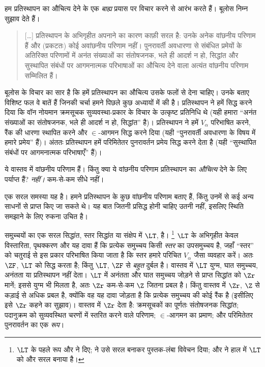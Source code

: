 \documentclass[../../../include/open-logic-section]{subfiles}
\begin{document}

हम प्रतिस्थापन का औचित्य देने के एक \emph{बाह्य} प्रयास पर विचार करने से
आरंभ करते हैं। बूलोस निम्न सुझाव देते हैं।
\begin{quote}
  [\ldots] प्रतिस्थापन के अभिगृहीत अपनाने का कारण काफ़ी सरल है: उनके अनेक
  वांछनीय परिणाम हैं और (प्रकटतः) कोई अवांछनीय परिणाम नहीं। पुनरावर्ती
  अवधारणा से संबंधित प्रमेयों के अतिरिक्त परिणामों में अनंत संख्याओं का
  संतोषजनक, भले ही आदर्श न हो, सिद्धांत और सुस्थापित संबंधों पर आगमनात्मक
  परिभाषाओं का औचित्य देने वाला अत्यंत वांछनीय परिणाम सम्मिलित हैं।
  \citep[229]{Boolos1971}
\end{quote}		
बूलोस के विचार का सार है कि हमें प्रतिस्थापन का औचित्य उसके फलों से देना
चाहिए। उनके बताए विशिष्ट फल वे बातें हैं जिनकी चर्चा हमने पिछले कुछ अध्यायों
में की है। प्रतिस्थापन ने हमें सिद्ध करने दिया कि वॉन नोयमान क्रमसूचक
सुव्यवस्था-प्रकार के विचार के उत्कृष्ट प्रतिनिधि थे (यही हमारा ``अनंत
संख्याओं का संतोषजनक, भले ही आदर्श न हो, सिद्धांत'' है)। प्रतिस्थापन ने हमें
$V_\alpha$ परिभाषित करने, रैंक की धारणा स्थापित करने और $\in$-आगमन सिद्ध
करने दिया (यही ``पुनरावर्ती अवधारणा के विषय में हमारे प्रमेय'' हैं)। अंततः
प्रतिस्थापन हमें परिमितेतर पुनरावर्तन प्रमेय सिद्ध करने देता है (यही
``सुस्थापित संबंधों पर आगमनात्मक परिभाषाएँ'' हैं)।

ये वास्तव में वांछनीय परिणाम हैं। किंतु क्या ये वांछनीय परिणाम प्रतिस्थापन
का \emph{औचित्य} देने के लिए पर्याप्त हैं? \emph{नहीं।} कम-से-कम सीधे नहीं।

एक सरल समस्या यह है। हमने प्रतिस्थापन के कुछ वांछनीय परिणाम बताए हैं, किंतु
उनमें से कई अन्य साधनों से प्राप्त किए जा सकते थे। यह बात जितनी प्रसिद्ध
होनी चाहिए उतनी नहीं, इसलिए स्थिति समझाने के लिए रुकना उचित है।

समुच्चयों का एक सरल सिद्धांत, स्तर सिद्धांत या संक्षेप में $\LT$, है।
\footnote{$\LT$ के पहले रूप \citet{Montague1965} और \citet{Scott1974} ने
दिए; \citet{Potter2004} ने उसे सरल बनाकर पुस्तक-लंबा विवेचन दिया; और
\citet{ButtonLT1} ने हाल में $\LT$ को और सरल बनाया है।} $\LT$ के अभिगृहीत
केवल विस्तारिता, पृथक्करण और यह दावा हैं कि प्रत्येक समुच्चय किसी
\emph{स्तर} का उपसमुच्चय है, जहाँ ``स्तर'' को चतुराई से इस प्रकार परिभाषित
किया जाता है कि स्तर हमारे परिचित $V_\alpha$ जैसा व्यवहार करें। अतः $\ZF$,
$\LT$ को सिद्ध करता है; किंतु $\LT$, $\ZF$ से \emph{बहुत} दुर्बल है। वास्तव
में $\LT$ युग्म, घात समुच्चय, अनंतता या प्रतिस्थापन नहीं देता। $\LT$ में
अनंतता और घात समुच्चय जोड़ने से प्राप्त सिद्धांत को $\Zr$ मानें; इससे युग्म
भी मिलता है, अतः $\Zr$ कम-से-कम $\Z$ जितना प्रबल है। किंतु वास्तव में
$\Zr$, $\Z$ से कड़ाई से अधिक प्रबल है, क्योंकि वह यह दावा जोड़ता है कि
प्रत्येक समुच्चय की कोई रैंक है (इसीलिए इसे $\Zr$ कहने का सुझाव)। वास्तव में
$\Zr$ देता है: क्रमसूचकों का पूर्णतः संतोषजनक सिद्धांत; पदानुक्रम को
सुव्यवस्थित चरणों में स्तरित करने वाले परिणाम; $\in$-आगमन का प्रमाण; और
परिमितेतर पुनरावर्तन का एक \emph{रूप}।
\end{document}
